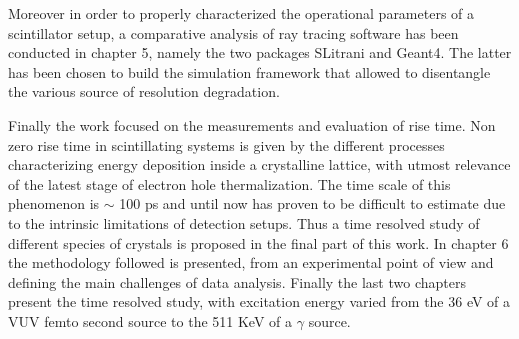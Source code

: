 Moreover in order to properly characterized the operational parameters of a scintillator setup, a comparative analysis of ray tracing software has been conducted in chapter 5, namely the two packages SLitrani and Geant4. The latter has been chosen to build the simulation framework that allowed to disentangle the various source of resolution degradation.

Finally the work focused on the measurements and evaluation of rise time. Non zero rise time in scintillating systems is given by the different processes characterizing energy deposition inside a crystalline lattice, with utmost relevance of the latest stage of electron hole thermalization. The time scale of this phenomenon is $\sim$ 100 ps and until now has proven to be difficult to estimate due to the intrinsic limitations of detection setups.
Thus a time resolved study of different species of crystals is proposed in the final part of this work.
In chapter 6 the methodology followed is presented, from an experimental point of view and defining the main challenges of data analysis.
Finally the last two chapters present the time resolved study, with excitation energy varied from the 36 eV of a VUV femto second source to the 511 KeV of a $\gamma$ source. 




